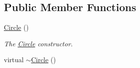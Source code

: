 \subsection*{Public Member Functions}
\begin{DoxyCompactItemize}
\item 
\hyperlink{classCircle_ad1ecfcfc7bf34529c6a6d6c448bf70fe}{Circle} ()
\begin{DoxyCompactList}\small\item\em The \hyperlink{classCircle}{Circle} constructor. \end{DoxyCompactList}\item 
\hypertarget{classCircle_ae3f30436e645d73e368e8ee55f8d1650}{virtual \hyperlink{classCircle_ae3f30436e645d73e368e8ee55f8d1650}{$\sim$\-Circle} ()}\label{classCircle_ae3f30436e645d73e368e8ee55f8d1650}


\end{DoxyCompactItemize}
